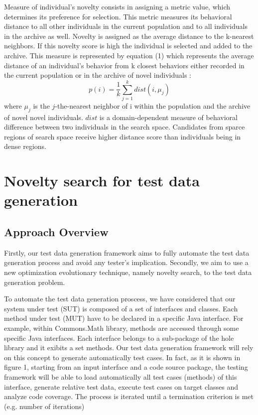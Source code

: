 \documentclass[conference]{IEEEtran}
\begin{document}
Measure of individual’s novelty consists in assigning a metric value, which determines its preference for selection. This metric measures its behavioral distance to all other individuals in the current population and to all individuals in the archive as well. Novelty is assigned as the average distance to the k-nearest neighbors. If this novelty score is high the individual is selected and added to the archive. This measure is represented by equation (1) which represents the average distance of an individual’s behavior from k closest behaviors either recorded in the current population or in the archive of novel individuals :
\begin{equation}
p(i) = \frac{1}{k} \sum_{j=1}^{k} dist(i,\mu _{j})
\end{equation}
where $\mu _{j}$ is the $j$-the-nearest neighbor of i within the population and the archive of novel novel individuals. $dist$ is a domain-dependent measure of behavioral difference between two individuals in the search space. Candidates from sparce regions of search space receive higher distance score than individuals being in dense regions.

\section{Novelty search for test data generation}
\subsection{Approach Overview}
Firstly, our test data generation framework aims to fully automate the test data generation process and avoid any tester’s implication. Secondly, we aim to use a new optimization evolutionary technique, namely novelty search, to the test data generation problem. 

To automate the test data generation proscess, we have considered that our system under test (SUT) is composed of a set of interfaces and classes. Each method under test (MUT) have to be declared in a specific Java interface. For example, within Commons.Math library, methods are accessed through some specific Java interfaces. Each interface belongs to a sub-package of the hole library and it exibits a set methods. Our test data generation framework will rely on this concept to generate automatically test cases. In fact, as it is shown in figure 1, starting from an input interface and a code source package, the testing framework will be able to load automatically all test cases (methods) of this interface, generate relative test data, execute test cases on target classes and analyze code coverage. The process is iterated until a termination criterion is met (e.g. number of iterations) 
\end{document}
